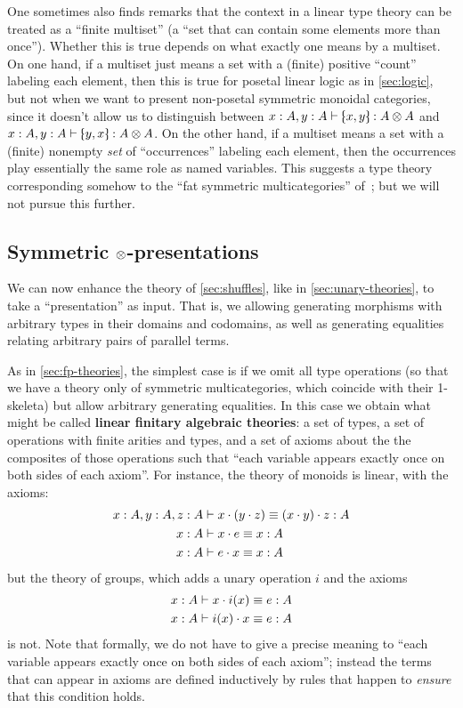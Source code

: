 One sometimes also finds remarks that the context in a linear type theory can be treated as a ``finite multiset'' (a ``set that can contain some elements more than once'').
Whether this is true depends on what exactly one means by a multiset.
On one hand, if a multiset just means a set with a (finite) positive ``count'' labeling each element, then this is true for posetal linear logic as in \cref{sec:logic}, but not when we want to present non-posetal symmetric monoidal categories, since it doesn't allow us to distinguish between $x:A,y:A \types \tpair x y:A\tensor A$ and $x:A,y:A \types \tpair y x:A\tensor A$.
On the other hand, if a multiset means a set with a (finite) nonempty \emph{set} of ``occurrences'' labeling each element, then the occurrences play essentially the same role as named variables.
This suggests a type theory corresponding somehow to the ``fat symmetric multicategories'' of~\cite[Appendix A]{leinster:higher-opds}; but we will not pursue this further.


\subsection{Symmetric $\otimes$-presentations}
\label{sec:symm-tensor-pres}

We can now enhance the theory of \cref{sec:shuffles}, like in \cref{sec:unary-theories}, to take a ``presentation'' as input.
That is, we  allowing generating morphisms with arbitrary types in their domains and codomains, as well as generating equalities relating arbitrary pairs of parallel terms.

As in \cref{sec:fp-theories}, the simplest case is if we omit all type operations (so that we have a theory only of symmetric multicategories, which coincide with their 1-skeleta) but allow arbitrary generating equalities.
In this case we obtain what might be called \textbf{linear finitary algebraic theories}: a set of types, a set of operations with finite arities and types, and a set of axioms about the the composites of those operations such that ``each variable appears exactly once on both sides of each axiom''.
For instance, the theory of monoids is linear, with the axioms:
\begin{align*}
  x:A,y:A,z:A &\vdash x\cdot (y\cdot z) \equiv (x\cdot y)\cdot z :A\\
  x:A &\vdash x\cdot e \equiv x:A\\
  x:A &\vdash e\cdot x \equiv x:A
\end{align*}
but the theory of groups, which adds a unary operation $i$ and the axioms
\begin{align*}
  x:A &\vdash x\cdot i(x) \equiv e:A \\
  x:A &\vdash i(x)\cdot x \equiv e:A
\end{align*}
is not.
Note that formally, we do not have to give a precise meaning to ``each variable appears exactly once on both sides of each axiom''; instead the terms that can appear in axioms are defined inductively by rules that happen to \emph{ensure} that this condition holds.

